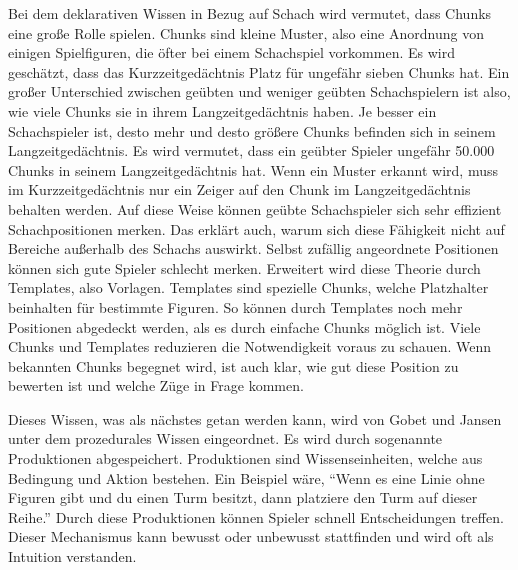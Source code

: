 Bei dem deklarativen Wissen in Bezug auf Schach wird vermutet, dass Chunks eine große Rolle spielen. Chunks sind kleine Muster, also eine Anordnung von einigen Spielfiguren, die öfter bei einem Schachspiel vorkommen. Es wird geschätzt, dass das Kurzzeitgedächtnis Platz für ungefähr sieben Chunks hat. Ein großer Unterschied zwischen geübten und weniger geübten Schachspielern ist also, wie viele Chunks sie in ihrem Langzeitgedächtnis haben. Je besser ein Schachspieler ist, desto mehr und desto größere Chunks befinden sich in seinem Langzeitgedächtnis. Es wird vermutet, dass ein geübter Spieler ungefähr 50.000 Chunks in seinem Langzeitgedächtnis hat. Wenn ein Muster erkannt wird, muss im Kurzzeitgedächtnis nur ein Zeiger auf den Chunk im Langzeitgedächtnis behalten werden. Auf diese Weise können geübte Schachspieler sich sehr effizient Schachpositionen merken. Das erklärt auch, warum sich diese Fähigkeit nicht auf Bereiche außerhalb des Schachs auswirkt. Selbst zufällig angeordnete Positionen können sich gute Spieler schlecht merken. Erweitert wird diese Theorie durch Templates, also Vorlagen. Templates sind spezielle Chunks, welche Platzhalter beinhalten für bestimmte Figuren. So können durch Templates noch mehr Positionen abgedeckt werden, als es durch einfache Chunks möglich ist. Viele Chunks und Templates reduzieren die Notwendigkeit voraus zu schauen. Wenn bekannten Chunks begegnet wird, ist auch klar, wie gut diese Position zu bewerten ist und welche Züge in Frage kommen.
\cite{gobet_templates_1996}

Dieses Wissen, was als nächstes getan werden kann, wird von Gobet und Jansen unter dem prozedurales Wissen eingeordnet. Es wird durch sogenannte Produktionen abgespeichert. Produktionen sind Wissenseinheiten, welche aus Bedingung und Aktion bestehen. Ein Beispiel wäre, \enquote{Wenn es eine Linie ohne Figuren gibt und du einen Turm besitzt, dann platziere den Turm auf dieser Reihe.} Durch diese Produktionen können Spieler schnell Entscheidungen treffen. Dieser Mechanismus kann bewusst oder unbewusst stattfinden und wird oft als Intuition verstanden.
\cite{gobet_training_2006}

